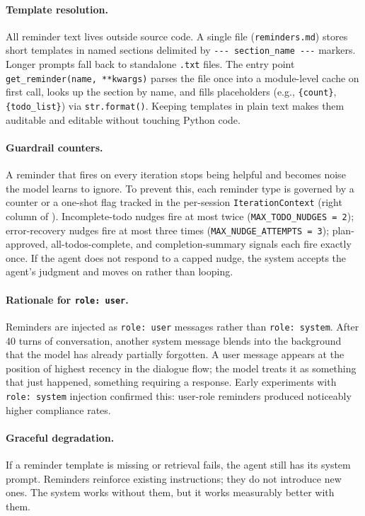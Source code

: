 \paragraph{Template resolution.} All reminder text lives outside source code. A single file (\texttt{reminders.md}) stores short templates in named sections delimited by \texttt{-{}-{}-~section\_name~-{}-{}-} markers. Longer prompts fall back to standalone \texttt{.txt} files. The entry point \texttt{get\_reminder(name, **kwargs)} parses the file once into a module-level cache on first call, looks up the section by name, and fills placeholders (e.g., \texttt{\{count\}}, \texttt{\{todo\_list\}}) via \texttt{str.format()}. Keeping templates in plain text makes them auditable and editable without touching Python code.

\paragraph{Guardrail counters.} A reminder that fires on every iteration stops being helpful and becomes noise the model learns to ignore. To prevent this, each reminder type is governed by a counter or a one-shot flag tracked in the per-session \texttt{IterationContext} (right column of ). Incomplete-todo nudges fire at most twice (\texttt{MAX\_TODO\_NUDGES~=~2}); error-recovery nudges fire at most three times (\texttt{MAX\_NUDGE\_ATTEMPTS~=~3}); plan-approved, all-todos-complete, and completion-summary signals each fire exactly once. If the agent does not respond to a capped nudge, the system accepts the agent's judgment and moves on rather than looping.

\paragraph{Rationale for \texttt{role:~user}.} Reminders are injected as \texttt{role:~user} messages rather than \texttt{role:~system}. After 40 turns of conversation, another system message blends into the background that the model has already partially forgotten. A user message appears at the position of highest recency in the dialogue flow; the model treats it as something that just happened, something requiring a response. Early experiments with \texttt{role:~system} injection confirmed this: user-role reminders produced noticeably higher compliance rates.

\paragraph{Graceful degradation.} If a reminder template is missing or retrieval fails, the agent still has its system prompt. Reminders reinforce existing instructions; they do not introduce new ones. The system works without them, but it works measurably better with them.

